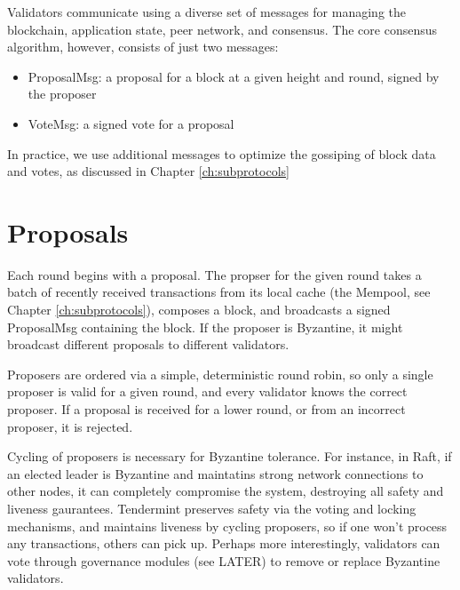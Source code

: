 Validators communicate using a diverse set of messages for managing the blockchain, application state, peer network, and consensus.
The core consensus algorithm, however, consists of just two messages:

\begin{itemize}
\item{ProposalMsg: a proposal for a block at a given height and round, signed by the proposer}
\item{VoteMsg: a signed vote for a proposal}
\end{itemize}

In practice, we use additional messages to optimize the gossiping of block data and votes, as discussed in Chapter \ref{ch:subprotocols}

\section{Proposals}

Each round begins with a proposal. 
The propser for the given round takes a batch of recently received transactions from its local cache (the Mempool, see Chapter \ref{ch:subprotocols}),
composes a block, and broadcasts a signed ProposalMsg containing the block.
If the proposer is Byzantine, it might broadcast different proposals to different validators.

Proposers are ordered via a simple, deterministic round robin, 
so only a single proposer is valid for a given round, 
and every validator knows the correct proposer. 
If a proposal is received for a lower round, or from an incorrect proposer, it is rejected.

Cycling of proposers is necessary for Byzantine tolerance. 
For instance, in Raft, if an elected leader is Byzantine and maintatins strong network connections to other nodes,
it can completely compromise the system, destroying all safety and liveness gaurantees.
Tendermint preserves safety via the voting and locking mechanisms, 
and maintains liveness by cycling proposers, so if one won't process any transactions, others can pick up.
Perhaps more interestingly, validators can vote through governance modules (see LATER) to remove or replace Byzantine validators.

\iffalse
TODO: move the tuning comment 
Upon entering a new round, validators wait ProposalTimeout to receive a complete proposal before broadcasting their pre-vote.
The ProposalTimeout thus serves as a critical paramter for tuning the performance of the system,
as it determines how much latency is permitted from proposers before validators start voting to skip them.
\fi

